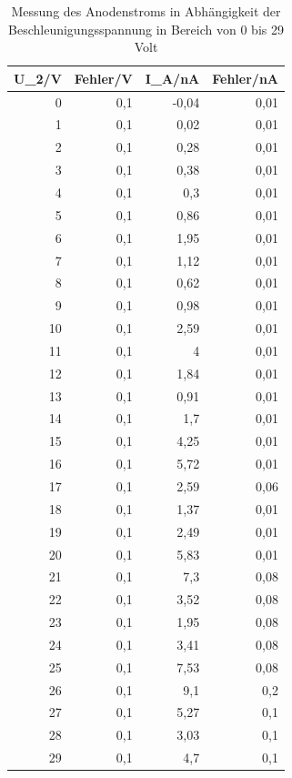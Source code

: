 \documentclass[12pt,a4paper]{article}
\begin{document}
\begin{table}[htbp]
\caption{Messung des Anodenstroms in Abhängigkeit der Beschleunigungsspannung in Bereich von 0 bis 29 Volt}
\begin{center}
\begin{tabular}{|r|r|r|r|}
\hline
\multicolumn{1}{|l|}{U\_2/V} & \multicolumn{1}{l|}{Fehler/V} & \multicolumn{1}{l|}{I\_A/nA} & \multicolumn{1}{l|}{Fehler/nA} \\ \hline
0 & 0,1 & -0,04 & 0,01 \\ \hline
1 & 0,1 & 0,02 & 0,01 \\ \hline
2 & 0,1 & 0,28 & 0,01 \\ \hline
3 & 0,1 & 0,38 & 0,01 \\ \hline
4 & 0,1 & 0,3 & 0,01 \\ \hline
5 & 0,1 & 0,86 & 0,01 \\ \hline
6 & 0,1 & 1,95 & 0,01 \\ \hline
7 & 0,1 & 1,12 & 0,01 \\ \hline
8 & 0,1 & 0,62 & 0,01 \\ \hline
9 & 0,1 & 0,98 & 0,01 \\ \hline
10 & 0,1 & 2,59 & 0,01 \\ \hline
11 & 0,1 & 4 & 0,01 \\ \hline
12 & 0,1 & 1,84 & 0,01 \\ \hline
13 & 0,1 & 0,91 & 0,01 \\ \hline
14 & 0,1 & 1,7 & 0,01 \\ \hline
15 & 0,1 & 4,25 & 0,01 \\ \hline
16 & 0,1 & 5,72 & 0,01 \\ \hline
17 & 0,1 & 2,59 & 0,06 \\ \hline
18 & 0,1 & 1,37 & 0,01 \\ \hline
19 & 0,1 & 2,49 & 0,01 \\ \hline
20 & 0,1 & 5,83 & 0,01 \\ \hline
21 & 0,1 & 7,3 & 0,08 \\ \hline
22 & 0,1 & 3,52 & 0,08 \\ \hline
23 & 0,1 & 1,95 & 0,08 \\ \hline
24 & 0,1 & 3,41 & 0,08 \\ \hline
25 & 0,1 & 7,53 & 0,08 \\ \hline
26 & 0,1 & 9,1 & 0,2 \\ \hline
27 & 0,1 & 5,27 & 0,1 \\ \hline
28 & 0,1 & 3,03 & 0,1 \\ \hline
29 & 0,1 & 4,7 & 0,1 \\ \hline
\end{tabular}
\end{center}
\label{tab:q_daten}
\end{table}
\end{document}
